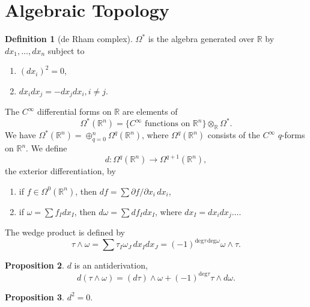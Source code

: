 \documentclass[twocolumn]{article}
\theoremstyle{definition}
\newtheorem{definition}{Definition}[section]
\newtheorem{proposition}[definition]{Proposition}
\theoremstyle{remark}
\begin{document}
\section{Algebraic Topology}
\begin{definition}[de Rham complex]
    $\Omega^*$ is the algebra generated over $\mathbb{R}$ by $dx_1, \dots, dx_n$ subject to
    \begin{enumerate}[noitemsep]
        \item $(dx_i)^2 = 0$,
        \item $dx_i dx_j = -dx_j dx_i, i \neq j$.
    \end{enumerate}
    The $C^\infty$ differential forms on $\mathbb{R}$ are elements of
    \begin{equation}
        \Omega^*(\mathbb{R}^n) = \{ C^\infty \textrm{ functions on } \mathbb{R}^n \} \otimes_\mathbb{R} \Omega^*.
    \end{equation}
    We have $\Omega^*(\mathbb{R}^n) = \oplus^n_{q=0} \Omega^q(\mathbb{R}^n)$,
    where $\Omega^q(\mathbb{R}^n)$ consists of the $C^\infty$ $q$-forms on $\mathbb{R}^n$. We define
    \begin{equation}
        d : \Omega^q(\mathbb{R}^n) \rightarrow \Omega^{q+1}(\mathbb{R}^n),
    \end{equation}
    the exterior differentiation, by
    \begin{enumerate}[noitemsep]
        \item if $f \in \Omega^0(\mathbb{R}^n)$, then $df = \sum \partial f / \partial x_i \, dx_i$,
        \item if $\omega = \sum f_I dx_I$, then $d\omega = \sum df_I dx_I$, where $dx_I = dx_i dx_j \dots $.
    \end{enumerate}
    The wedge product is defined by
    \begin{equation}
        \tau \wedge \omega = \sum \tau_I \omega_J \, dx_I dx_J = (-1)^{\mathrm{deg }\tau\,\mathrm{deg }\omega} \omega \wedge \tau.
    \end{equation}
\end{definition}
\begin{proposition}
    $d$ is an antiderivation,
    \begin{equation}
        d(\tau \wedge \omega) = (d\tau) \wedge \omega + (-1)^{\mathrm{deg} \tau} \tau \wedge d\omega.
    \end{equation}
\end{proposition}
\begin{proposition}
    $d^2 = 0$.
\end{proposition}
\end{document}
